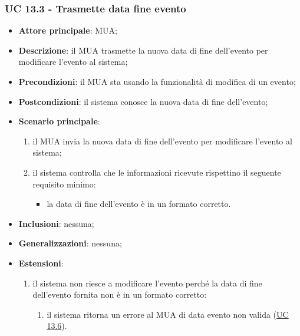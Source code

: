     \subsubsection{UC 13.3 - Trasmette data fine evento} \label{sec:UC13.3}
    \begin{itemize}
        \item \textbf{Attore principale}: MUA;
        \item \textbf{Descrizione}: il MUA trasmette la nuova data di fine dell'evento per modificare l'evento al sistema;
        \item \textbf{Precondizioni}: il MUA sta usando la funzionalità di modifica di un evento;
        \item \textbf{Postcondizioni}: il sistema conosce la nuova data di fine dell'evento;
        \item \textbf{Scenario principale}:
            \begin{enumerate}
                \item il MUA invia la nuova data di fine dell'evento per modificare l'evento al sistema;
                \item il sistema controlla che le informazioni ricevute rispettino il seguente requisito minimo:
                    \begin{itemize}
                        \item la data di fine dell'evento è in un formato corretto.
                    \end{itemize}
            \end{enumerate}
        \item \textbf{Inclusioni}: nessuna;
        \item \textbf{Generalizzazioni}: nessuna;
        \item \textbf{Estensioni}:
            \begin{enumerate}[label=\alph*.]
                \item il sistema non riesce a modificare l'evento perché la data di fine dell'evento fornita non è in un formato corretto:
                \begin{enumerate}[label=\arabic*.]
                    \item il sistema ritorna un errore al MUA di data evento non valida (\hyperref[sec:UC13.6]{UC 13.6}).
                \end{enumerate}
            \end{enumerate}
    \end{itemize}


